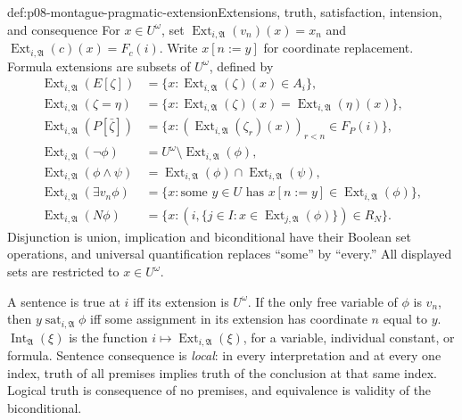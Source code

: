 \begin{hbdefinition}{def:p08-montague-pragmatic-extension}{Extensions, truth, satisfaction, intension, and consequence}
For \(x\in U^\omega\), set
\(\operatorname{Ext}_{i,\mathfrak A}(v_n)(x)=x_n\) and
\(\operatorname{Ext}_{i,\mathfrak A}(c)(x)=F_c(i)\).
Write \(x[n:=y]\) for coordinate replacement. Formula extensions
are subsets of \(U^\omega\), defined by
\begin{align*}
 \operatorname{Ext}_{i,\mathfrak A}(E[\zeta])
   &=\{x:\operatorname{Ext}_{i,\mathfrak A}(\zeta)(x)\in A_i\},\\
 \operatorname{Ext}_{i,\mathfrak A}(\zeta=\eta)
   &=\{x:\operatorname{Ext}_{i,\mathfrak A}(\zeta)(x)
          =\operatorname{Ext}_{i,\mathfrak A}(\eta)(x)\},\\
 \operatorname{Ext}_{i,\mathfrak A}(P[\bar\zeta])
   &=\{x:(\operatorname{Ext}_{i,\mathfrak A}(\zeta_r)(x))_{r<n}
                   \in F_P(i)\},\\
 \operatorname{Ext}_{i,\mathfrak A}(\neg\phi)
   &=U^\omega\setminus\operatorname{Ext}_{i,\mathfrak A}(\phi),\\
 \operatorname{Ext}_{i,\mathfrak A}(\phi\land\psi)
   &=\operatorname{Ext}_{i,\mathfrak A}(\phi)
                    \cap\operatorname{Ext}_{i,\mathfrak A}(\psi),\\
 \operatorname{Ext}_{i,\mathfrak A}(\exists v_n\phi)
   &=\{x:\text{some }y\in U\text{ has }
          x[n:=y]\in\operatorname{Ext}_{i,\mathfrak A}(\phi)\},\\
 \operatorname{Ext}_{i,\mathfrak A}(N\phi)
   &=\{x:(i,\{j\in I:x\in\operatorname{Ext}_{j,\mathfrak A}(\phi)\})
                  \in R_N\}.
\end{align*}
Disjunction is union, implication and biconditional have their Boolean
set operations, and universal quantification replaces ``some'' by ``every.''
All displayed sets are restricted to \(x\in U^\omega\).

A sentence is true at \(i\) iff its extension is \(U^\omega\).
If the only free variable of \(\phi\) is \(v_n\), then
\(y\operatorname{sat}_{i,\mathfrak A}\phi\) iff some assignment in
its extension has coordinate \(n\) equal to \(y\).
\(\operatorname{Int}_{\mathfrak A}(\xi)\) is the function
\(i\mapsto\operatorname{Ext}_{i,\mathfrak A}(\xi)\), for a variable,
individual constant, or formula. Sentence consequence is \emph{local}:
in every interpretation and at every one index, truth of all premises
implies truth of the conclusion at that same index. Logical truth is
consequence of no premises, and equivalence is validity of the biconditional.
\end{hbdefinition}

